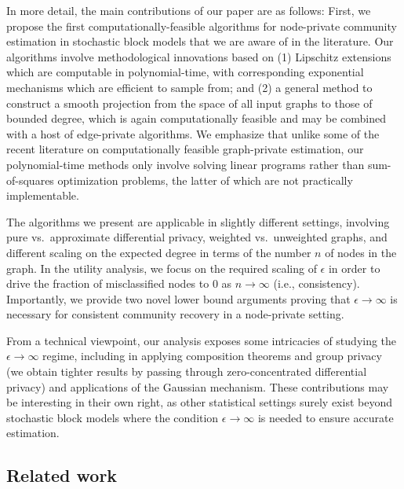 \documentclass{article}
\begin{document}
In more detail, the main contributions of our paper are as follows: First, we propose the first computationally-feasible algorithms for node-private community estimation in stochastic block models that we are aware of in the literature. Our algorithms involve methodological innovations based on (1) Lipschitz extensions which are computable in polynomial-time, with corresponding exponential mechanisms which are efficient to sample from; and (2) a general method to construct a smooth projection from the space of all input graphs to those of bounded degree, which is again computationally feasible and may be combined with a host of edge-private algorithms. We emphasize that unlike some of the recent literature on computationally feasible graph-private estimation, our polynomial-time methods only involve solving linear programs rather than sum-of-squares optimization problems, the latter of which are not practically implementable.

The algorithms we present are applicable in slightly different settings, involving pure vs.\ approximate differential privacy, weighted vs.\ unweighted graphs, and different scaling on the expected degree in terms of the number $n$ of nodes in the graph. In the utility analysis, we focus on the required scaling of $\epsilon$ in order to drive the fraction of misclassified nodes to 0 as $n \rightarrow \infty$ (i.e., consistency). Importantly, we provide two novel lower bound arguments proving that $\epsilon \rightarrow \infty$ is necessary for consistent community recovery in a node-private setting.

From a technical viewpoint, our analysis exposes some intricacies of studying the $\epsilon \rightarrow \infty$ regime, including in applying composition theorems and group privacy (we obtain tighter results by passing through zero-concentrated differential privacy) and applications of the Gaussian mechanism. These contributions may be interesting in their own right, as other statistical settings surely exist beyond stochastic block models where the condition $\epsilon \rightarrow \infty$ is needed to ensure accurate estimation.


\subsection{Related work}
\end{document}
